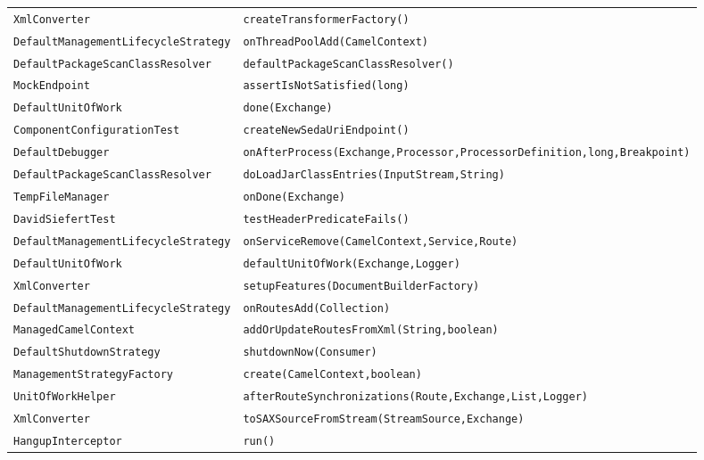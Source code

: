 \begin{center}
\begin{longtable}{ll}
\lstinline/XmlConverter/&{\lstinline/createTransformerFactory()/}\\
\lstinline/DefaultManagementLifecycleStrategy/&{\lstinline/onThreadPoolAdd(CamelContext)/}\\
\lstinline/DefaultPackageScanClassResolver/&{\lstinline/defaultPackageScanClassResolver()/}\\
\lstinline/MockEndpoint/&{\lstinline/assertIsNotSatisfied(long)/}\\
\lstinline/DefaultUnitOfWork/&{\lstinline/done(Exchange)/}\\
\lstinline/ComponentConfigurationTest/&{\lstinline/createNewSedaUriEndpoint()/}\\
\lstinline/DefaultDebugger/&{\lstinline/onAfterProcess(Exchange,Processor,ProcessorDefinition,long,Breakpoint)/}\\
\lstinline/DefaultPackageScanClassResolver/&{\lstinline/doLoadJarClassEntries(InputStream,String)/}\\
\lstinline/TempFileManager/&{\lstinline/onDone(Exchange)/}\\
\lstinline/DavidSiefertTest/&{\lstinline/testHeaderPredicateFails()/}\\
\lstinline/DefaultManagementLifecycleStrategy/&{\lstinline/onServiceRemove(CamelContext,Service,Route)/}\\
\lstinline/DefaultUnitOfWork/&{\lstinline/defaultUnitOfWork(Exchange,Logger)/}\\
\lstinline/XmlConverter/&{\lstinline/setupFeatures(DocumentBuilderFactory)/}\\
\lstinline/DefaultManagementLifecycleStrategy/&{\lstinline/onRoutesAdd(Collection)/}\\
\lstinline/ManagedCamelContext/&{\lstinline/addOrUpdateRoutesFromXml(String,boolean)/}\\
\lstinline/DefaultShutdownStrategy/&{\lstinline/shutdownNow(Consumer)/}\\
\lstinline/ManagementStrategyFactory/&{\lstinline/create(CamelContext,boolean)/}\\
\lstinline/UnitOfWorkHelper/&{\lstinline/afterRouteSynchronizations(Route,Exchange,List,Logger)/}\\
\lstinline/XmlConverter/&{\lstinline/toSAXSourceFromStream(StreamSource,Exchange)/}\\
\lstinline/HangupInterceptor/&{\lstinline/run()/}\\

\end{longtable}
\end{center}


